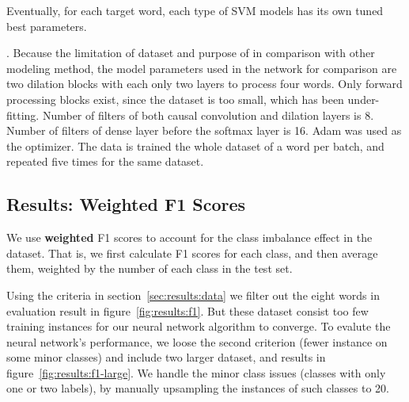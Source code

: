 Eventually, for each target word, each type of SVM models has its own tuned best
parameters.

.
Because the limitation of dataset and purpose of in comparison with other modeling method, the model parameters used in the network for comparison are two dilation blocks with each only two layers to process four words. Only forward processing blocks exist, since the dataset is too small, which has been under-fitting. Number of filters of both causal convolution and dilation layers is 8. Number of filters of dense layer before the softmax layer is 16. Adam was used as the optimizer. The data is trained the whole dataset of a word per batch, and repeated five times for the same dataset. 

\subsection{Results: Weighted F1 Scores}
\label{sec:eval:results}

We use \textbf{weighted} F1 scores to account for the class imbalance effect in
the dataset. 
That is, we first calculate F1 scores for each class, and then average them,
weighted by the number of each class in the test set.

Using the criteria in section~\ref{sec:results:data} we filter out the eight words
in evaluation result in figure~\ref{fig:results:f1}.
But these dataset consist too few training instances for our neural network
algorithm to converge.
To evalute the neural network's performance, we loose the second criterion (fewer
instance on some minor classes) and include two larger dataset, and results in
figure~\ref{fig:results:f1-large}.
We handle the minor class issues (classes with only one or two labels), by
manually upsampling the instances of such classes to 20.

